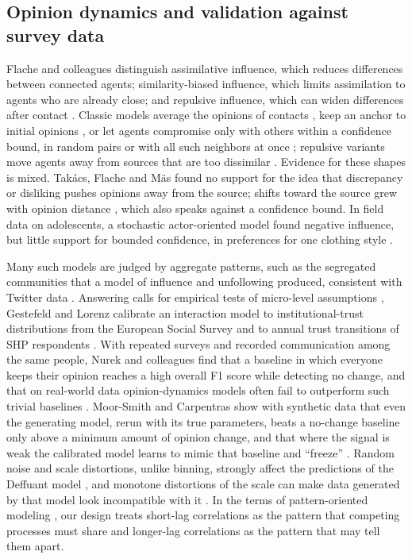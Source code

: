 \subsection{Opinion dynamics and validation against survey data}\label{sec:bg-opinion}

Flache and colleagues distinguish assimilative influence, which reduces differences between connected agents; similarity-biased influence, which limits assimilation to agents who are already close; and repulsive influence, which can widen differences after contact \cite{flache2017}. Classic models average the opinions of contacts \cite{degroot1974}, keep an anchor to initial opinions \cite{friedkin1990}, or let agents compromise only with others within a confidence bound, in random pairs \cite{deffuant2000} or with all such neighbors at once \cite{hegselmann2002}; repulsive variants move agents away from sources that are too dissimilar \cite{jager2005}. Evidence for these shapes is mixed. Tak\'acs, Flache and M\"as found no support for the idea that discrepancy or disliking pushes opinions away from the source; shifts toward the source grew with opinion distance \cite{takacs2016}, which also speaks against a confidence bound. In field data on adolescents, a stochastic actor-oriented model found negative influence, but little support for bounded confidence, in preferences for one clothing style \cite{tang2025empirical}.

Many such models are judged by aggregate patterns, such as the segregated communities that a model of influence and unfollowing produced, consistent with Twitter data \cite{sasahara2021}. Answering calls for empirical tests of micro-level assumptions \cite{flache2017}, Gestefeld and Lorenz calibrate an interaction model to institutional-trust distributions from the European Social Survey and to annual trust transitions of SHP respondents \cite{gestefeld2023}. With repeated surveys and recorded communication among the same people, Nurek and colleagues find that a baseline in which everyone keeps their opinion reaches a high overall F1 score while detecting no change, and that on real-world data opinion-dynamics models often fail to outperform such trivial baselines \cite{coding2024}. Moor-Smith and Carpentras show with synthetic data that even the generating model, rerun with its true parameters, beats a no-change baseline only above a minimum amount of opinion change, and that where the signal is weak the calibrated model learns to mimic that baseline and ``freeze'' \cite{moor2026}. Random noise and scale distortions, unlike binning, strongly affect the predictions of the Deffuant model \cite{carpentras2022}, and monotone distortions of the scale can make data generated by that model look incompatible with it \cite{carpentras2023}. In the terms of pattern-oriented modeling \cite{grimm2005}, our design treats short-lag correlations as the pattern that competing processes must share and longer-lag correlations as the pattern that may tell them apart.

